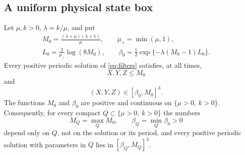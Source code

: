 \subsection{A uniform physical state box}
\begin{lemma}\label{lem:statebox}
Let $\mu,k>0$, $\lambda=k/\mu$, and put
\begin{gather*}
M_0=\frac{(\lambda+\mu)(\lambda+1)}{\mu},\qquad
\mu_\wedge=\min(\mu,1),\\
L_0=\frac{2}{\mu_\wedge}\log(8M_0),\qquad
\beta_0=\tfrac12\exp\{-\lambda(M_0-1)L_0\}.
\end{gather*}
Every positive periodic solution of \eqref{eq:filters} satisfies, at all times,
\begin{equation}\label{eq:statebox}
X,Y,Z\le M_0
\end{equation}
and
\begin{equation}\label{eq:twosidedbox}
(X,Y,Z)\in[\beta_0,M_0]^3.
\end{equation}
The functions $M_0$ and $\beta_0$ are positive and continuous on $\{\mu>0,\ k>0\}$. Consequently, for every compact $Q\subset\{\mu>0,\ k>0\}$ the numbers
\[
M_Q=\max_QM_0,\qquad \beta_Q=\min_Q\beta_0>0
\]
depend only on $Q$, not on the solution or its period, and every positive periodic solution with parameters in $Q$ lies in $[\beta_Q,M_Q]^3$.
\end{lemma}
